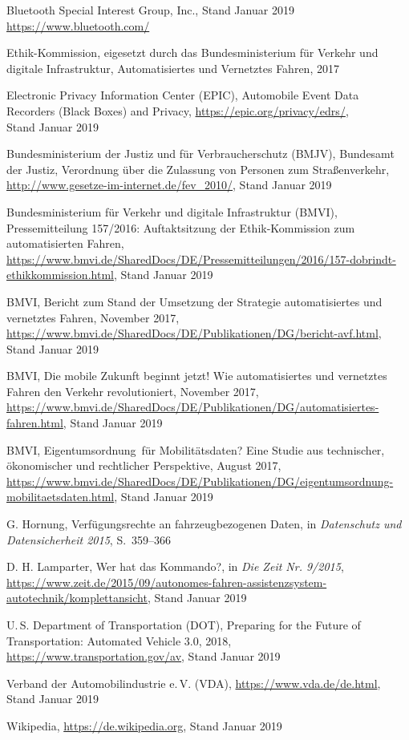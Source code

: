\documentclass[twoside,a4paper,12pt]{article}
\begin{document}
\newpage

\cleardoublepage
\begin{thebibliography}{99}

 Bluetooth Special Interest Group, Inc., Stand Januar 2019\\ \url{https://www.bluetooth.com/}

 Ethik-Kommission, eigesetzt durch das Bundesministerium für Verkehr und digitale Infrastruktur, Automatisiertes und
Vernetztes Fahren, 2017

 Electronic Privacy Information Center (EPIC), Automobile Event Data Recorders (Black Boxes) and Privacy,
\url{https://epic.org/privacy/edrs/}, \\Stand Januar 2019

 Bundesministerium der Justiz und für Verbraucherschutz (BMJV), Bundesamt der Justiz, Verordnung über die Zulassung von Personen zum Straßenverkehr, 
\url{http://www.gesetze-im-internet.de/fev_2010/}, Stand Januar 2019

 Bundesministerium für Verkehr und digitale Infrastruktur (BMVI), Pressemitteilung 157/2016: Auftaktsitzung der Ethik-Kommission zum automatisierten Fahren,
\url{https://www.bmvi.de/SharedDocs/DE/Pressemitteilungen/2016/157-dobrindt-ethikkommission.html}, Stand Januar 2019

 BMVI, Bericht zum Stand der Umsetzung der Strategie automatisiertes und vernetztes Fahren,
November 2017, \url{https://www.bmvi.de/SharedDocs/DE/Publikationen/DG/bericht-avf.html}, Stand Januar 2019

 BMVI, Die mobile Zukunft beginnt jetzt! Wie automatisiertes und vernetztes Fahren den Verkehr revolutioniert,
November 2017, \url{https://www.bmvi.de/SharedDocs/DE/Publikationen/DG/automatisiertes-fahren.html}, Stand Januar 2019

 BMVI, \glqq Eigentumsordnung\grqq\ für Mobilitätsdaten? Eine Studie aus technischer, ökonomischer und rechtlicher Perspektive,
August 2017, \url{https://www.bmvi.de/SharedDocs/DE/Publikationen/DG/eigentumsordnung-mobilitaetsdaten.html}, Stand Januar 2019

 G. Hornung, Verfügungsrechte an fahrzeugbezogenen Daten, in \textit{Datenschutz und Datensicherheit 2015}, \mbox{S. 359--366}

 D. H. Lamparter, Wer hat das Kommando?, in \textit{Die Zeit Nr. 9/2015}, \\
\url{https://www.zeit.de/2015/09/autonomes-fahren-assistenzsystem-autotechnik/komplettansicht}, Stand Januar 2019

 U.\,S. Department of Transportation (DOT), Preparing for the Future of Transportation: Automated Vehicle 3.0, 2018,
\url{https://www.transportation.gov/av}, Stand Januar 2019

 Verband der Automobilindustrie e.\,V. (VDA), \url{https://www.vda.de/de.html}, Stand Januar 2019

 Wikipedia, \url{https://de.wikipedia.org}, Stand Januar 2019

\end{thebibliography}

\newpage
\end{document}
